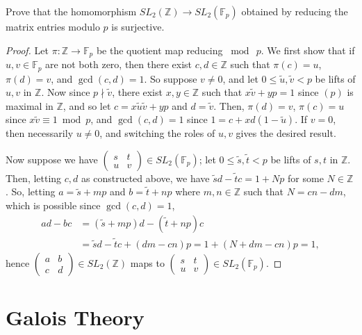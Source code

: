 \documentclass[12pt]{article}
\theoremstyle{remark}
\newcommand{\SL}{\mathit{SL}}
\begin{document}
\begin{problem}
  Prove that the homomorphism $\SL_2(\mathbb{Z}) \rightarrow \SL_2(\mathbb{F}_p)$ obtained by reducing the matrix entries modulo $p$ is surjective.
\end{problem}
\begin{proof}
  Let $\pi \colon \mathbb{Z} \to \mathbb{F}_p$ be the quotient map reducing $\bmod\ p$. We first show that if $u,v \in \mathbb{F}_p$ are not both zero, then there exist $c,d \in \mathbb{Z}$ such that $\pi(c) = u$, $\pi(d) = v$, and $\gcd(c,d)=1$. So suppose $v \ne 0$, and let $0 \le \tilde{u},\tilde{v} < p$ be lifts of $u,v$ in $\mathbb{Z}$. Now since $p \nmid \tilde{v}$, there exist $x,y \in \mathbb{Z}$ such that $x\tilde{v} + yp = 1$ since $(p)$ is maximal in $\mathbb{Z}$, and so let $c = x\tilde{u}\tilde{v} + yp$ and $d = \tilde{v}$. Then, $\pi(d) = v$, $\pi(c) = u$ since $x\tilde{v} \equiv 1 \bmod p$, and $\gcd(c,d)=1$ since $1 = c + xd(1-\tilde{u})$. If $v = 0$, then necessarily $u \ne 0$, and switching the roles of $u,v$ gives the desired result.
  \par Now suppose we have $\left( \begin{smallmatrix}s & t\\u & v\end{smallmatrix} \right) \in \SL_2(\mathbb{F}_p)$; let $0 \le \tilde{s},\tilde{t} < p$ be lifts of $s,t$ in $\mathbb{Z}$. Then, letting $c,d$ as constructed above, we have $\tilde{s}d - \tilde{t}c = 1 + Np$ for some $N \in \mathbb{Z}$. So, letting $a = \tilde{s} + mp$ and $b = \tilde{t} + np$ where $m,n \in \mathbb{Z}$ such that $N = cn - dm$, which is possible since $\gcd(c,d)=1$,
    \begin{align*}
      ad - bc  &= (\tilde{s} + mp)d - (\tilde{t} + np)c\\
      &= \tilde{s}d - \tilde{t}c + (dm - cn)p = 1 + (N + dm - cn)p = 1,
    \end{align*}
    hence $\left( \begin{smallmatrix}a & b\\c & d\end{smallmatrix} \right) \in \SL_2(\mathbb{Z})$ maps to $\left( \begin{smallmatrix}s & t\\u & v\end{smallmatrix} \right) \in \SL_2(\mathbb{F}_p)$.
\end{proof}
\endgroup

\section{Galois Theory}
\end{document}
